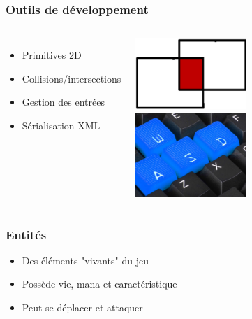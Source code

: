 \documentclass{beamer}
\begin{document}
\begin{frame}
\frametitle{Outils de développement}
\begin{columns}
\begin{itemize}
	\item Primitives 2D
	\item Collisions/intersections
	\item Gestion des entrées
	\item Sérialisation XML
\end{itemize}
\begin{center}
\includegraphics[width=0.5\textwidth]{img/pres_prim2d.png}\\
\includegraphics[width=0.5\textwidth]{img/pres_keys.jpg}\\
\end{center}
\end{columns}
\end{frame}

\begin{frame}
\frametitle{Entités}
\begin{itemize}
	\item Des éléments "vivants" du jeu
	\item Possède vie, mana et caractéristique
	\item Peut se déplacer et attaquer
\end{itemize}
\end{frame}
	
\end{document}
